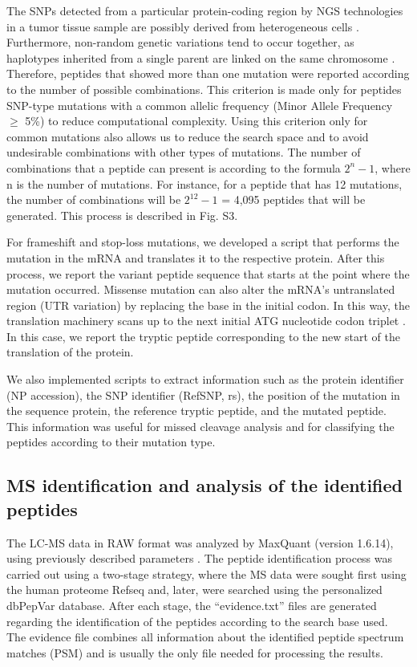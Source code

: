 \documentclass{ieeeaccess}
\begin{document}
The SNPs detected from a particular protein-coding region by NGS technologies in a tumor tissue sample are possibly derived from heterogeneous cells \cite{CHOONG2020}. Furthermore, non-random genetic variations tend to occur together, as haplotypes inherited from a single parent are linked on the same chromosome \cite{CHOONG2020}. Therefore, peptides that showed more than one mutation were reported according to the number of possible combinations. This criterion is made only for peptides SNP-type mutations with a common allelic frequency (Minor Allele Frequency $\geq$ 5\%) to reduce computational complexity. Using this criterion only for common mutations also allows us to reduce the search space and to avoid undesirable combinations with other types of mutations. The number of combinations that a peptide can present is according to the formula $2^n - 1$, where n is the number of mutations. For instance, for a peptide that has 12 mutations, the number of combinations will be $2^{12} - 1$ = 4,095 peptides that will be generated. This process is described in Fig. S3.

For frameshift and stop-loss mutations, we developed a script that performs the mutation in the mRNA and translates it to the respective protein. After this process, we report the variant peptide sequence that starts at the point where the mutation occurred. Missense mutation can also alter the mRNA's untranslated region (UTR variation) by replacing the base in the initial codon. In this way, the translation machinery scans up to the next initial ATG nucleotide codon triplet \cite{Hinnebusch2016-ta}. In this case, we report the tryptic peptide corresponding to the new start of the translation of the protein.

We also implemented scripts to extract information such as the protein identifier (NP accession), the SNP identifier (RefSNP, rs), the position of the mutation in the sequence protein, the reference tryptic peptide, and the mutated peptide. This information was useful for missed cleavage analysis and for classifying the peptides according to their mutation type.

\subsection{MS identification and analysis of the identified peptides}

The LC-MS data in RAW format was analyzed by MaxQuant (version 1.6.14), using previously described parameters \cite{Machado2019-sj}. The peptide identification process was carried out using a two-stage strategy, where the MS data were sought first using the human proteome Refseq and, later, were searched using the personalized dbPepVar database. After each stage, the ``evidence.txt'' files are generated regarding the identification of the peptides according to the search base used. The evidence file combines all information about the identified peptide spectrum matches (PSM) and is usually the only file needed for processing the results.
\end{document}
